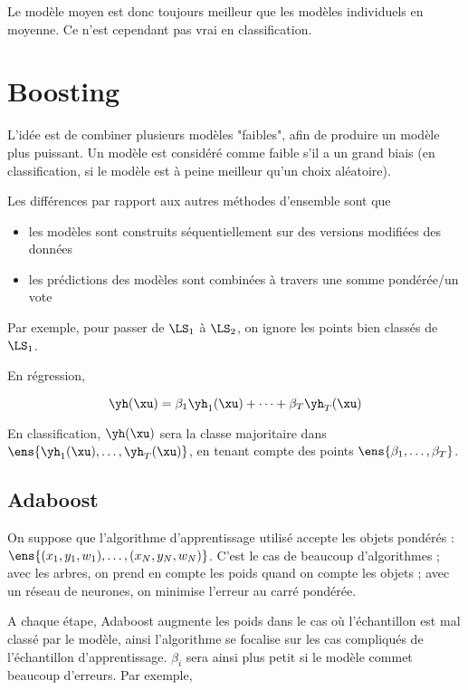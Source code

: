 Le modèle moyen est donc toujours meilleur que les modèles individuels en moyenne. Ce n'est cependant pas vrai en classification.
	
\section{Boosting}
	
L'idée est de combiner plusieurs modèles "faibles", afin de produire un modèle plus puissant. Un modèle est considéré comme faible s'il a un grand biais (en classification, si le modèle est à peine meilleur qu'un choix aléatoire).

Les différences par rapport aux autres méthodes d'ensemble sont que

\begin{itemize}
	\item les modèles sont construits séquentiellement sur des versions modifiées des données
	\item les prédictions des modèles sont combinées à travers une somme pondérée/un vote
\end{itemize}


Par exemple, pour passer de $\LS_1$ à $\LS_2$, on ignore les points bien classés de $\LS_1$.

En régression,

$$\yh(\xu) = \beta_1\yh_1(\xu) + \dots + \beta_T \yh_T(\xu)$$

En classification, $\yh(\xu)$ sera la classe majoritaire dans $\ens{\yh_1(\xu), \dots , \yh_T(\xu)}$, en tenant compte des points $\ens{\beta_1, \dots , \beta_T}$.

	\subsection{Adaboost}
	
	On suppose que l'algorithme d'apprentissage utilisé accepte les objets pondérés : $\ens{(x_1, y_1, w_1), \dots , (x_N, y_N, w_N)}$. C'est le cas de beaucoup d'algorithmes ; avec les arbres, on prend en compte les poids quand on compte les objets ; avec un réseau de neurones, on minimise l'erreur au carré pondérée.
	
	A chaque étape, Adaboost augmente les poids dans le cas où l'échantillon est mal classé par le modèle, ainsi l'algorithme se focalise sur les cas compliqués de l'échantillon d'apprentissage. $\beta_i$ sera ainsi plus petit si le modèle commet beaucoup d'erreurs. Par exemple,
	
